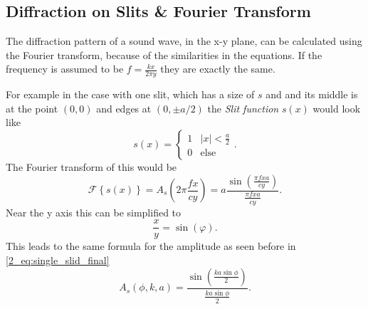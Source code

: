 \subsection{Diffraction on Slits \& Fourier Transform}\label{2_Acoustics_sec:diffraction_fourier}
The diffraction pattern of a sound wave, in the x-y plane, can be calculated using the Fourier transform, because of the similarities in the equations. If the frequency is assumed to be $f = \frac{k x}{2 \pi y}$ they are exactly the same. \cite{diffraction_fourier} 

For example in the case with one slit, which has a size of $s$ and and its middle is at the point $(0,0)$ and edges at $(0,\pm a/2)$ the \textit{Slit function} $s(x)$ would look like
\begin{equation}
     s(x) =
    \begin{cases}
      1 & \text{$|x| < \frac{a}{2}$}\\
      0 & \text{else}
     \end{cases}.
\end{equation}
The Fourier transform of this would be
\begin{equation}
    \mathcal{F}\left \{ s(x) \right \} = A_s\left ( 2\pi\frac{f x}{c y} \right ) = a\frac{\sin{\left(  \frac{\pi f x a}{c y} \right )}}{\frac{\pi f x a}{c y}}. 
\end{equation}
Near the y axis this can be simplified to \cite{alma99116706330905515}
\begin{equation}
    \frac{x}{y} = \sin{(\varphi)}.
\end{equation}
This leads to the same formula for the amplitude as seen before in \ref{2_eq:single_slid_final}
\begin{equation}
    A_s(\phi, k, a) = \frac{\sin \left ( \frac{ka \sin \phi}{2}\right )}{ \frac{ka \sin \phi}{2}}.
\end{equation}
